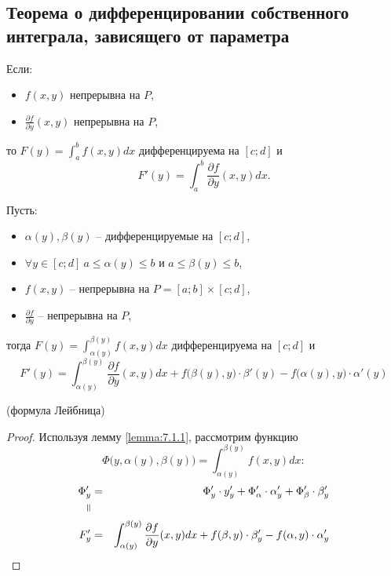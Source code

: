 \subsection{Теорема о дифференцировании собственного интеграла, зависящего от параметра}

\begin{lemma}\label{lemma:7.1.1}
    Если:
    \begin{itemize}
        \item $f(x,y)$ непрерывна на $P$,
        \item $\frac{\partial f}{\partial y}(x,y)$ непрерывна на $P$,
    \end{itemize}
    то $F(y) = \int_{a}^{b}f(x,y)dx$ дифференцируема на $[c;d]$ и
    \[
        F'(y) = \int_{a}^{b}\frac{\partial f}{\partial y}(x,y)dx.
    \]
\end{lemma}

\begin{theorem}\label{theorem:7.1.2}
    Пусть:
    \begin{itemize}
        \item $\alpha(y), \beta(y)$ -- дифференцируемые на $[c;d]$,
        \item $\forall y \in [c;d] \ a\leqslant \alpha(y) \leqslant b$ и $a \leqslant \beta(y) \leqslant b$,
        \item $f(x,y)$ -- непрерывна на $P = [a;b] \times [c;d]$,
        \item $\frac{\partial f}{\partial y}$ -- непрерывна на $P$,
    \end{itemize}
    тогда $F(y) = \int_{\alpha(y)}^{\beta(y)}f(x,y)dx$ дифференцируема на $[c;d]$ и
    \[
        F'(y) = \int_{\alpha(y)}^{\beta(y)}\frac{\partial f}{\partial y}(x,y)dx + f\big(\beta(y),y\big) \cdot \beta'(y) - f\big(\alpha(y),y\big)\cdot \alpha'(y)
    \]
    \begin{center}
        (формула Лейбница)
    \end{center}
\end{theorem}

\begin{proof}
    Используя лемму \ref{lemma:7.1.1}, рассмотрим функцию
    \[
        \Phi\big(y,\alpha(y),\beta(y)\big) = \int_{\alpha(y)}^{\beta(y)}f(x,y)dx:
    \]
    \begin{eqnarray*}
        \Phi_y' & = & \Phi_y' \cdot y_y' + \Phi_\alpha'\cdot\alpha_y' + \Phi_\beta' \cdot \beta_y'                                       \\
        \verteq &   &                                                                                                                    \\
        F_y'    & = & \int_{\alpha(y)}^{\beta(y)}\frac{\partial f}{\partial y}(x,y)dx + f(\beta,y)\cdot \beta_y' - f(\alpha,y)\cdot\alpha_y'
    \end{eqnarray*}
\end{proof}

